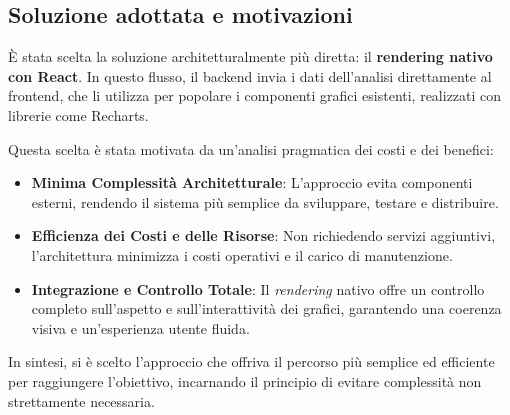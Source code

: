 \subsection{Soluzione adottata e motivazioni}
È stata scelta la soluzione architetturalmente più diretta: il \textbf{rendering nativo con React}. In questo flusso, il \gls{backend} invia i dati dell'analisi direttamente al \gls{frontend}, che li utilizza per popolare i componenti grafici esistenti, realizzati con librerie come Recharts.

Questa scelta è stata motivata da un'analisi pragmatica dei costi e dei benefici:
\begin{itemize}
    \item \textbf{Minima Complessità Architetturale}: L'approccio evita componenti esterni, rendendo il sistema più semplice da sviluppare, testare e distribuire.
    \item \textbf{Efficienza dei Costi e delle Risorse}: Non richiedendo servizi aggiuntivi, l'architettura minimizza i costi operativi e il carico di manutenzione.
    \item \textbf{Integrazione e Controllo Totale}: Il \textit{rendering} nativo offre un controllo completo sull'aspetto e sull'interattività dei grafici, garantendo una coerenza visiva e un'esperienza utente fluida.
\end{itemize}
In sintesi, si è scelto l'approccio che offriva il percorso più semplice ed efficiente per raggiungere l'obiettivo, incarnando il principio di evitare complessità non strettamente necessaria.